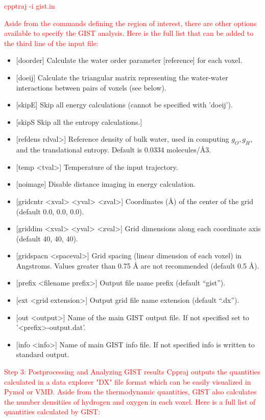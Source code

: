 \documentclass[9pt,tutorial]{livecoms}
\newcommand{\todo}{\textcolor{red}}
\begin{document}
\todo{cpptraj -i gist.in}
	
\todo{Aside from the commands defining the region of interest, there are other options available to specify the GIST analysis. Here is the full list that can be added to the third line of the input file:} 
\begin{itemize}
	\item{[doorder] Calculate the water order parameter [reference] for each voxel.}
	\item{[doeij] Calculate the triangular matrix representing the water-water interactions between pairs of voxels (see below).}
	\item{[skipE] Skip all energy calculations (cannot be specified with ’doeij’).}
	\item{[skipS Skip all the entropy calculations.]}
	\item{[refdens rdval>] Reference density of bulk water, used in computing $g_O, g_H$, and the translational entropy. Default is 0.0334 molecules/Å3.}
	\item{[temp <tval>] Temperature of the input trajectory.}
	\item{[noimage] Disable distance imaging in energy calculation.}
	\item{[gridcntr <xval> <yval> <zval>] Coordinates (Å) of the center of the grid (default 0.0, 0.0, 0.0).}
	\item{[griddim <xval> <yval> <zval>] Grid dimensions along each coordinate axis (default 40, 40, 40).}
	\item{[gridspacn <spaceval>] Grid spacing (linear dimension of each voxel) in Angstroms. Values greater than 0.75 Å are not recommended (default 0.5 Å).}
	\item{[prefix <filename prefix>] Output file name prefix (default “gist”).}
	\item{[ext <grid extension>] Output grid file name extension (default “.dx”).}
	\item{[out <output>] Name of the main GIST output file. If not specified set to ’<prefix>-output.dat’.}
	\item{[info <info>] Name of main GIST info file. If not specified info is written to standard output.}

\end{itemize}

\todo{Step 3: Postprocessing and Analyzing GIST results}
\todo{Cppraj outputs the quantities calculated in a data explorer "DX" file format which can be easily visualized in Pymol or VMD.  Aside from the thermodynamic quantities, GIST also calculates the number densitiies of hydrogen and oxygen in each voxel. Here is a full list of quantities calculated by GIST:}
\end{document}
